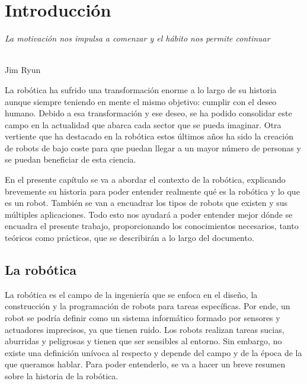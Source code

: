 \chapter{Introducción}
\label{cap:capitulo1}
\setcounter{page}{1}

\begin{flushright}
\begin{minipage}[]{10cm}
\emph{La motivación nos impulsa a comenzar y el hábito nos permite continuar}\\
\end{minipage}\\

Jim Ryun\\
\end{flushright}

\vspace{1cm}

La robótica ha sufrido una transformación enorme a lo largo de su historia aunque siempre teniendo en mente el mismo objetivo: cumplir con el deseo humano. Debido a esa transformación y ese deseo, se ha podido consolidar este campo en la actualidad que abarca cada sector que se pueda imaginar. Otra vertiente que ha destacado en la robótica estos últimos años ha sido la creación de robots de bajo coste para que puedan llegar a un mayor número de personas y se puedan beneficiar de esta ciencia. 

En el presente capítulo se va a abordar el contexto de la robótica, explicando brevemente su historia para poder entender realmente qué es la robótica y lo que es un robot. También se van a encuadrar los tipos de robots que existen y sus múltiples aplicaciones. Todo esto nos ayudará a poder entender mejor dónde se encuadra el presente trabajo, proporcionando los conocimientos necesarios, tanto teóricos como prácticos, que se describirán a lo largo del documento.\\

\section{La robótica}
\label{sec:robotica} %

La robótica es el campo de la ingeniería que se enfoca en el diseño, la construcción y la programación de robots para tareas específicas. Por ende, un robot se podría definir como un sistema informático formado por sensores y actuadores imprecisos, ya que tienen ruido. Los robots realizan tareas sucias, aburridas y peligrosas y tienen que ser sensibles al entorno. Sin embargo, no existe una definición unívoca al respecto y depende del campo y de la época de la que queramos hablar. Para poder entenderlo, se va a hacer un breve resumen sobre la historia de la robótica.\\

